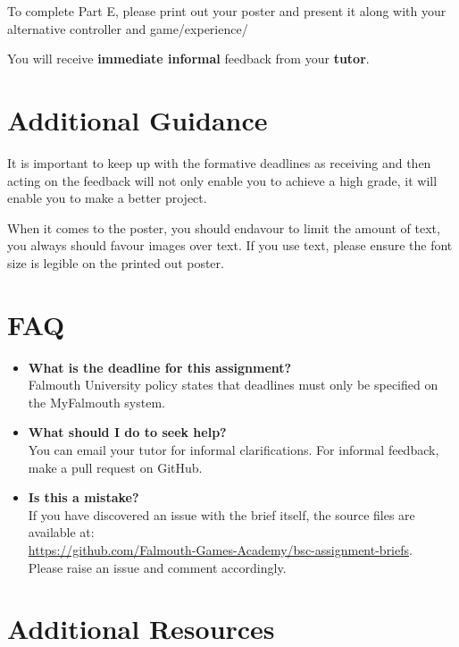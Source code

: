 \documentclass{../../fal_assignment}
\begin{document}
	To complete Part E, please print out your poster and present it along with your alternative controller and game/experience/

	You will receive \textbf{immediate informal} feedback from your \textbf{tutor}.

\section*{Additional Guidance}
It is important to keep up with the formative deadlines as receiving and then acting on the feedback will not only enable you to achieve a high grade, it will enable
you to make a better project. 

When it comes to the poster, you should endavour to limit the amount of text, you always should favour images over text. If you use text, please ensure the font size is legible on the printed out poster.

\section*{FAQ}

\begin{itemize}
	\item 	\textbf{What is the deadline for this assignment?} \\ 
    		Falmouth University policy states that deadlines must only be specified on the MyFalmouth system.
    		
	\item 	\textbf{What should I do to seek help?} \\ 
    		You can email your tutor for informal clarifications. For informal feedback, make a pull request on GitHub. 
    		
    	\item 	\textbf{Is this a mistake?} \\ 	
    		If you have discovered an issue with the brief itself, the source files are available at: \\
    		\url{https://github.com/Falmouth-Games-Academy/bsc-assignment-briefs}.\\
    		 Please raise an issue and comment accordingly.
\end{itemize}

\section*{Additional Resources}
\end{document}
